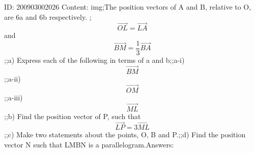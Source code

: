 \documentclass{article}
\begin{document}
ID: 200903002026
Content:
img;The position vectors of A and B, relative to O, are 6a and 6b respectively. ; $$\vec{OL} = \vec{LA}$$ and $$\vec{BM} = \frac{1}{3} \vec{BA}$$;;a) Express each of the following in terms of a and b;;a-i) $$\vec{BM}$$;;a-ii) $$\vec{OM}$$;;a-iii) $$\vec{ML}$$;;b) Find the position vector of P, such that $$ \vec{LP} = 3 \vec{ML}$$;;c) Make two statements about the points, O, B and P.;;d) Find the position vector N such that LMBN is a parallelogram.Answers:
\end{document}
